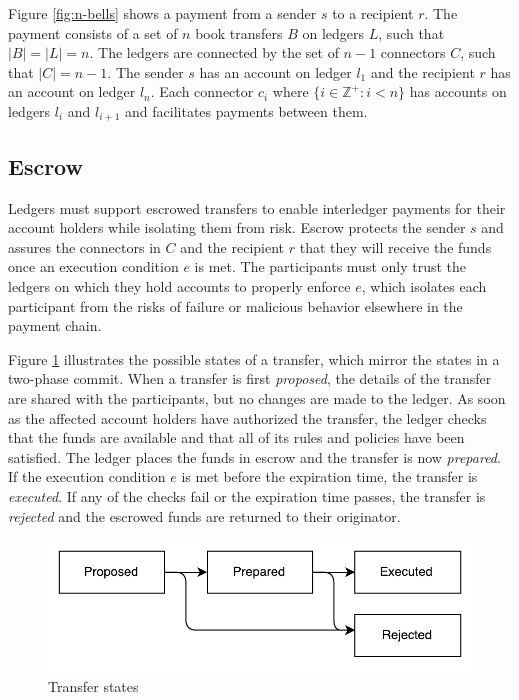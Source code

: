 \documentclass[letterpaper,twocolumn,10pt]{article}
\begin{document}
Figure \ref{fig:n-bells} shows a payment from a sender $s$ to a recipient $r$. The payment consists of a set of $n$ book transfers $B$ on ledgers $L$, such that $ \left\vert{B}\right\vert = \left\vert{L}\right\vert = n $. The ledgers are connected by the set of $n-1$ connectors $C$, such that $ \left\vert{C}\right\vert = n-1 $. The sender $s$ has an account on ledger $l_1$ and the recipient $r$ has an account on ledger $l_n$. Each connector $c_i$ where $ \{ i \in \mathbb{Z}^+ : i < n \} $ has accounts on ledgers $l_i$ and $l_{i+1}$ and facilitates payments between them.



\subsection{Escrow}

Ledgers must support escrowed transfers to enable interledger payments for their account holders while isolating them from risk. Escrow protects the sender $s$ and assures the connectors in $C$ and the recipient $r$ that they will receive the funds once an execution condition $e$ is met. The participants must only trust the ledgers on which they hold accounts to properly enforce $e$, which isolates each participant from the risks of failure or malicious behavior elsewhere in the payment chain.

Figure \ref{fig:transfer-states} illustrates the possible states of a transfer, which mirror the states in a two-phase commit. \cite[p.~466]{Gray:1978:NDB:647433.723863}  When a transfer is first \textit{proposed}, the details of the transfer are shared with the participants, but no changes are made to the ledger. As soon as the affected account holders have authorized the transfer, the ledger checks that the funds are available and that all of its rules and policies have been satisfied. The ledger places the funds in escrow and the transfer is now \textit{prepared}. If the execution condition $e$ is met before the expiration time, the transfer is \textit{executed}. If any of the checks fail or the expiration time passes, the transfer is \textit{rejected} and the escrowed funds are returned to their originator.

\begin{figure}[ht]
    \centering
    \includegraphics[width=\columnwidth]{figures/transfer-states.pdf}
    \caption{Transfer states}
    \label{fig:transfer-states}
\end{figure}
\end{document}
